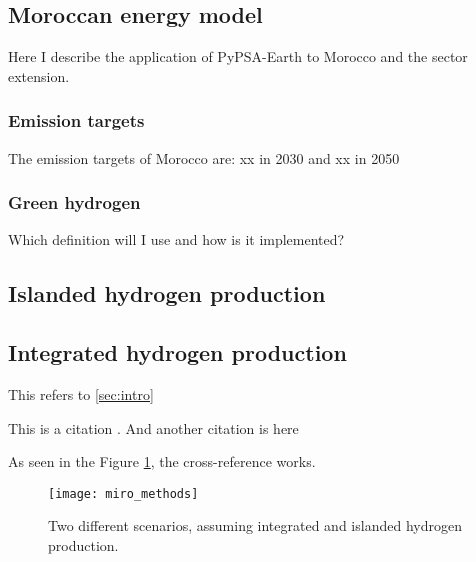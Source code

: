 
\subsection{Moroccan energy model}
Here I describe the application of PyPSA-Earth \cite{Parzen2022} to Morocco and the sector extension.
\subsubsection{Emission targets}
The emission targets of Morocco are: xx in 2030 and xx in 2050
\subsubsection{Green hydrogen}
Which definition will I use and how is it implemented?
\subsection{Islanded hydrogen production}
\subsection{Integrated hydrogen production}

This refers to \ref{sec:intro}

This is a citation \cite{Schumm2018}. And another citation is here \cite{Neumann2021}

As seen in the Figure \ref{fig:methods_scenarios}, the cross-reference works.

\begin{figure}[h!]
    \centering
    \texttt{[image: miro\_methods]}
    \caption{Two different scenarios, assuming integrated and islanded hydrogen production.}
    \label{fig:methods_scenarios}
\end{figure}

